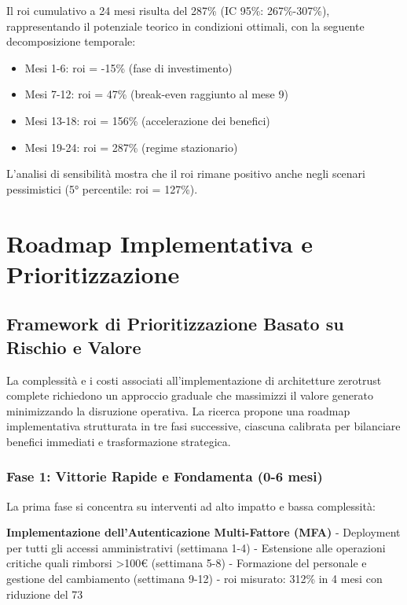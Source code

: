 Il \gls{roi} cumulativo a 24 mesi risulta del 287\% (IC 95\%: 267\%-307\%), rappresentando il potenziale teorico in condizioni ottimali, con la seguente decomposizione temporale:
\begin{itemize}
    \item Mesi 1-6: \gls{roi} = -15\% (fase di investimento)
    \item Mesi 7-12: \gls{roi} = 47\% (break-even raggiunto al mese 9)
    \item Mesi 13-18: \gls{roi} = 156\% (accelerazione dei benefici)
    \item Mesi 19-24: \gls{roi} = 287\% (regime stazionario)

\end{itemize}
L'analisi di sensibilità mostra che il \gls{roi} rimane positivo anche negli scenari pessimistici (5° percentile: \gls{roi} = 127\%).

\section{\texorpdfstring{Roadmap Implementativa e Prioritizzazione}{2.6 - Roadmap Implementativa e Prioritizzazione}}

\subsection{\texorpdfstring{Framework di Prioritizzazione Basato su Rischio e Valore}{2.6.1 - Framework di Prioritizzazione Basato su Rischio e Valore}}

La complessità e i costi associati all'implementazione di architetture \gls{zerotrust} complete richiedono un approccio graduale che massimizzi il valore generato minimizzando la disruzione operativa. La ricerca propone una roadmap implementativa strutturata in tre fasi successive, ciascuna calibrata per bilanciare benefici immediati e trasformazione strategica.

\subsubsection{\texorpdfstring{Fase 1: Vittorie Rapide e Fondamenta (0-6 mesi)}{2.6.1.1 - Fase 1: Vittorie Rapide e Fondamenta (0-6 mesi)}}

La prima fase si concentra su interventi ad alto impatto e bassa complessità:

\textbf{Implementazione dell'Autenticazione Multi-Fattore (MFA)}
- Deployment per tutti gli accessi amministrativi (settimana 1-4)
- Estensione alle operazioni critiche quali rimborsi >100€ (settimana 5-8)
- Formazione del personale e gestione del cambiamento (settimana 9-12)
- \gls{roi} misurato: 312\% in 4 mesi con riduzione del 73%

